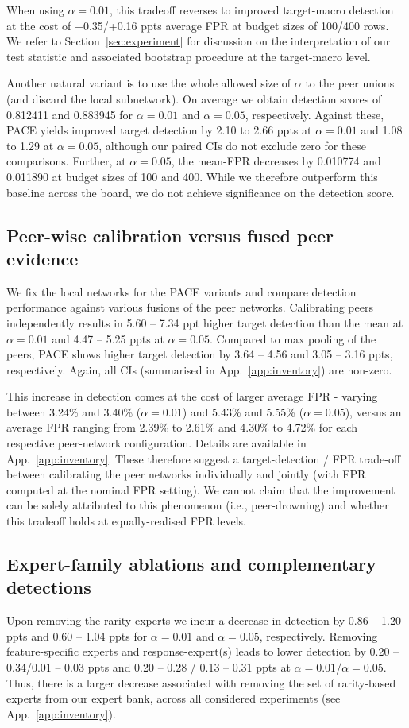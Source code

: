 When using $\alpha = 0.01$, this tradeoff reverses to improved target-macro detection at the cost of +0.35/+0.16 ppts average FPR at budget sizes of 100/400 rows. We refer to Section~\ref{sec:experiment} for discussion on the interpretation of our test statistic and associated bootstrap procedure at the target-macro level.

Another natural variant is to use the whole allowed size of $\alpha$ to the peer unions (and discard the local subnetwork). On average we obtain detection scores of 0.812411 and 0.883945 for $\alpha = 0.01$ and $\alpha = 0.05$, respectively. Against these, PACE yields improved target detection by 2.10 to 2.66 ppts at $\alpha = 0.01$ and 1.08 to 1.29 at $\alpha = 0.05$, although our paired CIs do not exclude zero for these comparisons. Further, at $\alpha = 0.05$, the mean-FPR decreases by 0.010774 and 0.011890 at budget sizes of 100 and 400. While we therefore outperform this baseline across the board, we do not achieve significance on the detection score.

\subsection{Peer-wise calibration versus fused peer evidence} 
\label{sec:peer-fusion} 
We fix the local networks for the PACE variants and compare detection performance against various fusions of the peer networks. Calibrating peers independently results in 5.60 -- 7.34 ppt higher target detection than the mean at $\alpha = 0.01$ and 4.47 -- 5.25 ppts at $\alpha = 0.05$. Compared to max pooling of the peers, PACE shows higher target detection by 3.64 -- 4.56 and 3.05 -- 3.16 ppts, respectively. Again, all CIs (summarised in App.~\ref{app:inventory}) are non-zero.

This increase in detection comes at the cost of larger average FPR - varying between 3.24\% and 3.40\% ($\alpha=0.01$) and 5.43\% and 5.55\% ($\alpha = 0.05$), versus an average FPR ranging from 2.39\% to 2.61\% and 4.30\% to 4.72\% for each respective peer-network configuration. Details are available in App.~\ref{app:inventory}. These therefore suggest a target-detection / FPR trade-off between calibrating the peer networks individually and jointly (with FPR computed at the nominal FPR setting). We cannot claim that the improvement can be solely attributed to this phenomenon (i.e., peer-drowning) and whether this tradeoff holds at equally-realised FPR levels.

\subsection{Expert-family ablations and complementary detections} 
Upon removing the rarity-experts we incur a decrease in detection by 0.86 -- 1.20 ppts and 0.60 -- 1.04 ppts for $\alpha = 0.01$ and $\alpha = 0.05$, respectively. Removing feature-specific experts and response-expert(s) leads to lower detection by 0.20 -- 0.34/0.01 -- 0.03 ppts and 0.20 -- 0.28 / 0.13 -- 0.31 ppts at $\alpha = 0.01$/$\alpha=0.05$. Thus, there is a larger decrease associated with removing the set of rarity-based experts from our expert bank, across all considered experiments (see App.~\ref{app:inventory}).

